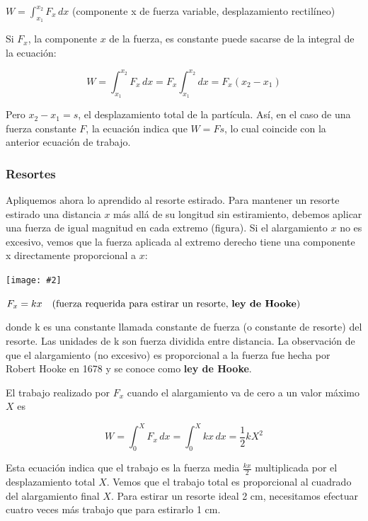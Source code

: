 \documentclass{article}
\newcommand{\newtitle}[1]{
    \color{titleColor}
    \subsubsection{#1}
    \color{black}
}
\newcommand{\bl}[1]{\textbf{#1}}
\newcommand{\definicion}[1]{%
    \vspace{0.5cm}
    \begin{definicionbox}
        #1
    \end{definicionbox}
    \vspace{0.5cm}
}
\newcommand{\ladoALado}[4]{
    \begin{minipage}[t]{#3\textwidth}
        \vspace{0pt}
        #1
    \end{minipage}
    \hfill
    \begin{minipage}[t]{#4\textwidth}
        \vspace{0pt}
        \centering
        \texttt{[image: \#2]}
    \end{minipage}
}
\begin{document}
    \definicion{
        \centering
        \( W = \int_{x_1}^{x_2} F_x \, dx \) \quad (componente x de fuerza variable, desplazamiento rectilíneo)
    }

    \par Si $F_x$, la componente $x$ de la fuerza, es constante puede sacarse de la integral de la ecuación:

    \[ W = \int_{x_1}^{x_2} F_x \, dx = F_x \int_{x_1}^{x_2} dx = F_x (x_2 - x_1) \]

    \par Pero $x_2 - x_1 = s$, el desplazamiento total de la partícula. Así, en el caso de una fuerza constante $F$, la ecuación indica que $W = Fs$, lo cual coincide con la anterior ecuación de trabajo.

    \vspace{0.5cm}

    \newtitle{Resortes}

    \ladoALado{
        \par Apliquemos ahora lo aprendido al resorte estirado. Para mantener un resorte estirado una distancia $x$ más allá de su longitud sin estiramiento, debemos aplicar una fuerza de igual magnitud en cada extremo (figura). Si el alargamiento $x$ no es excesivo, vemos que la fuerza aplicada al extremo derecho tiene una componente x directamente proporcional a $x$:
    }{img/5.3-2.png}{0.6}{0.4}

    \definicion{
        \centering
        \( F_x = k x \quad \text{(fuerza requerida para estirar un resorte, \bl{ley de Hooke})} \)
    }

    \noindent donde k es una constante llamada constante de fuerza (o constante de resorte) del resorte. Las unidades de k son fuerza dividida entre distancia. La observación de que el alargamiento (no excesivo) es proporcional a la fuerza fue hecha por Robert Hooke en 1678 y se conoce como \bl{ley de Hooke}.
    
    \par El trabajo realizado por $F_x$ cuando el alargamiento va de cero a un valor máximo $X$ es

    \[ W = \int_{0}^{X} F_x \, dx = \int_{0}^{X} k x \, dx = \frac{1}{2} k X^2 \]

    \par Esta ecuación indica que el trabajo es la fuerza media $\frac{k x}{2}$ multiplicada por el desplazamiento total $X$. Vemos que el trabajo total es proporcional al cuadrado del alargamiento final $X$. Para estirar un resorte ideal 2 cm, necesitamos efectuar cuatro veces más trabajo que para estirarlo 1 cm.
\end{document}

